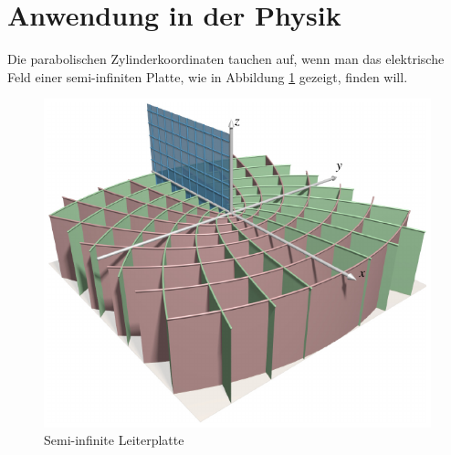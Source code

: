 %
%
%
\section{Anwendung in der Physik 
\label{parzyl:section:teil2}}

Die parabolischen Zylinderkoordinaten tauchen auf, wenn man das elektrische Feld einer semi-infiniten Platte, wie in Abbildung \ref{parzyl:fig:leiterplatte} gezeigt, finden will.
\begin{figure}
	\centering
	\begin{minipage}{.7\textwidth}
		 \centering
		\includegraphics[width=\textwidth]{papers/parzyl/images/halfplane.pdf}
		\caption{Semi-infinite Leiterplatte}
		\label{parzyl:fig:leiterplatte}
	\end{minipage}%
	\begin{minipage}{.25\textwidth}
		\centering

\end{minipage}
\end{figure}
